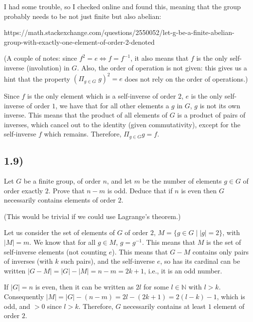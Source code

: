 \documentclass[12pt, letterpaper, twoside]{report}
\begin{document}

I had some trouble, so I checked online and found this, meaning that the group probably needs to be not just finite but also abelian:

https://math.stackexchange.com/questions/2550052/let-g-be-a-finite-abelian-group-with-exactly-one-element-of-order-2-denoted

(A couple of notes: since $f^2 = e \Leftrightarrow f = f^{-1}$, it also means that $f$ is the only self-inverse (involution) in $G$. Also, the order of operation is not given: this gives us a hint that the property $(\Pi_{g \in G} \; g)^2 = e$ does not rely on the order of operations.)

Since $f$ is the only element which is a self-inverse of order $2$, $e$ is the only self-inverse of order $1$, we have that for all other elements a $g$ in $G$, $g$ is not its own inverse. This means that the product of all elements of $G$ is a product of pairs of inverses, which cancel out to the identity (given commutativity), except for the self-inverse $f$ which remains. Therefore, $\Pi_{g \in G} g = f$.



\subsection*{1.9)}

Let $G$ be a finite group, of order $n$, and let $m$ be the number of elements $g \in G$ of order exactly $2$. Prove that $n - m$ is odd. Deduce that if $n$ is even then $G$ necessarily contains elements of order $2$.

(This would be trivial if we could use Lagrange's theorem.)

Let us consider the set of elements of $G$ of order $2$, $M = \{ g \in G \mid |g| = 2 \}$, with $|M| = m$. We know that for all $g \in M$, $g = g^{-1}$. This means that $M$ is the set of self-inverse elements (not counting $e$). This means that $G - M$ contains only pairs of inverses (with $k$ such pairs), and the self-inverse $e$, so has its cardinal can be written $|G - M| = |G| - |M| = n - m = 2k + 1$, i.e., it is an odd number.

If $|G| = n$ is even, then it can be written as $2l$ for some $l \in \mathbb{N}$ with $l > k$. Consequently $|M| = |G| - (n - m) = 2l - (2k + 1) = 2(l - k) - 1$, which is odd, and $> 0$ since $l > k$. Therefore, $G$ necessarily contains at least $1$ element of order $2$.
\end{document}
